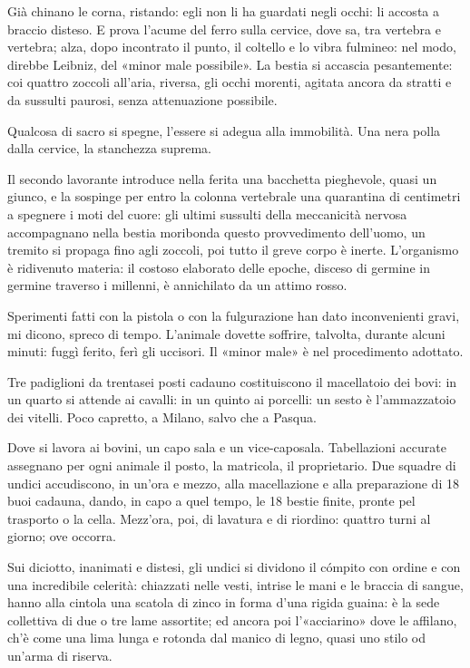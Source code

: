 Già chinano le corna, ristando: egli non li ha guardati negli occhi: li accosta a braccio disteso. E prova l’acume del ferro sulla cervice, dove sa, tra vertebra e vertebra; alza, dopo incontrato il punto, il coltello e lo vibra fulmineo: nel modo, direbbe Leibniz, del «minor male possibile». La bestia si accascia pesantemente: coi quattro zoccoli all’aria, riversa, gli occhi morenti, agitata ancora da stratti e da sussulti paurosi, senza attenuazione possibile.

Qualcosa di sacro si spegne, l’essere si adegua alla immobilità. Una nera polla dalla cervice, la stanchezza suprema.

Il secondo lavorante introduce nella ferita una bacchetta pieghevole, quasi un giunco, e la sospinge per entro la colonna vertebrale una quarantina di centimetri a spegnere i moti del cuore: gli ultimi sussulti della meccanicità nervosa accompagnano nella bestia moribonda questo provvedimento dell’uomo, un tremito si propaga fino agli zoccoli, poi tutto il greve corpo è inerte. L’organismo è ridivenuto materia: il costoso elaborato delle epoche, disceso di germine in germine traverso i millenni, è annichilato da un attimo rosso.

Sperimenti fatti con la pistola o con la fulgurazione han dato inconvenienti gravi, mi dicono, spreco di tempo. L’animale dovette soffrire, talvolta, durante alcuni minuti: fuggì ferito, ferì gli uccisori. Il «minor male» è nel procedimento adottato.

Tre padiglioni da trentasei posti cadauno costituiscono il macellatoio dei bovi: in un quarto si attende ai cavalli: in un quinto ai porcelli: un sesto è l’ammazzatoio dei vitelli. Poco capretto, a Milano, salvo che a Pasqua.

Dove si lavora ai bovini, un capo sala e un vice-caposala. Tabellazioni accurate assegnano per ogni animale il posto, la matricola, il proprietario. Due squadre di undici accudiscono, in un’ora e mezzo, alla macellazione e alla preparazione di 18 buoi cadauna, dando, in capo a quel tempo, le 18 bestie finite, pronte pel trasporto o la cella. Mezz’ora, poi, di lavatura e di riordino: quattro turni al giorno; ove occorra.

Sui diciotto, inanimati e distesi, gli undici si dividono il cómpito con ordine e con una incredibile celerità: chiazzati nelle vesti, intrise le mani e le braccia di sangue, hanno alla cintola una scatola di zinco in forma d’una rigida guaina: è la sede collettiva di due o tre lame assortite; ed ancora poi l’«acciarino» dove le affilano, ch’è come una lima lunga e rotonda dal manico di legno, quasi uno stilo od un’arma di riserva.


